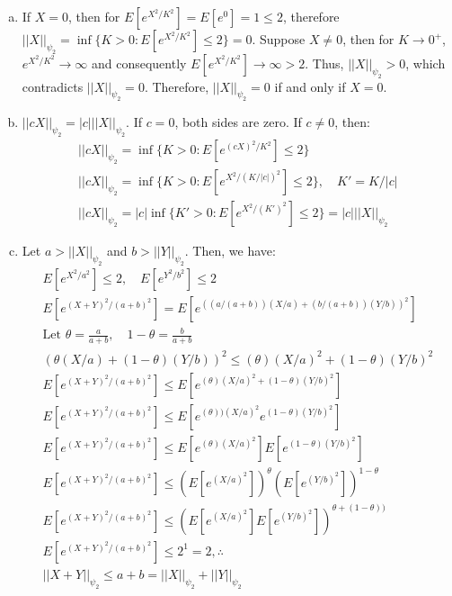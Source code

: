 \documentclass[11pt,a4paper,margin=1in]{article}
\begin{document}
\section{}
\begin{enumerate}[(a)]
    \item If $X = 0$, then for $E[e^{X^2/K^2}] = E[e^{0}] = 1 \leq 2$, therefore
    $||X||_{\psi_2} = \inf\{K > 0 : E[e^{X^2/K^2}] \leq 2\} = 0$. Suppose $X \neq 0$,
    then for $K \rightarrow 0^+$, $e^{X^2/K^2} \rightarrow \infty$ and consequently
    $E[e^{X^2/K^2}] \rightarrow \infty > 2$. Thus, $||X||_{\psi_2} > 0$, which
    contradicts $||X||_{\psi_2} = 0$. Therefore, $||X||_{\psi_2} = 0$ if and only if $X = 0$.
    \item $||cX||_{\psi_2} = |c|||X||_{\psi_2}$. If $c = 0$, both sides are zero.
    If $c \neq 0$, then:
    \begin{gather*}
        ||cX||_{\psi_2} = \inf\{K > 0 : E[e^{(cX)^2/K^2}] \leq 2\} \\
        ||cX||_{\psi_2} = \inf\{K > 0 : E[e^{X^2/(K/|c|)^2}] \leq 2\}, \quad K' = K/|c| \\
        ||cX||_{\psi_2} = |c| \inf\{K' > 0 : E[e^{X^2/(K')^2}] \leq 2\} = |c|||X||_{\psi_2}
    \end{gather*}
    \item Let $a > ||X||_{\psi_2}$ and $b > ||Y||_{\psi_2}$. Then, we have:
    \begin{gather*}
        E[e^{X^2/a^2}] \leq 2, \quad E[e^{Y^2/b^2}] \leq 2 \\
        E[e^{(X+Y)^2/(a+b)^2}] = E[e^{((a/(a+b))(X/a) + (b/(a+b))(Y/b))^2}] \\
        \text{Let } \theta = \frac{a}{a+b}, \quad 1 - \theta = \frac{b}{a+b} \\
        \left(\theta(X/a) + (1 - \theta)(Y/b)\right)^2 \leq (\theta)(X/a)^2 + (1 - \theta)(Y/b)^2 \\
        E[e^{(X+Y)^2/(a+b)^2}] \leq E[e^{(\theta)(X/a)^2 + (1 - \theta)(Y/b)^2}] \\
        E[e^{(X+Y)^2/(a+b)^2}] \leq E[e^{(\theta))(X/a)^2} e^{(1 - \theta)(Y/b)^2}] \\
        E[e^{(X+Y)^2/(a+b)^2}] \leq E[e^{(\theta)(X/a)^2}] E[e^{(1 - \theta)(Y/b)^2}] \\
        E[e^{(X+Y)^2/(a+b)^2}] \leq (E[e^{(X/a)^2}])^{\theta} (E[e^{(Y/b)^2}])^{1 - \theta} \\
        E[e^{(X+Y)^2/(a+b)^2}] \leq (E[e^{(X/a)^2}]E[e^{(Y/b)^2}])^{\theta + (1 - \theta))} \\
        E[e^{(X+Y)^2/(a+b)^2}] \leq 2^1 = 2, \therefore\\
        ||X+Y||_{\psi_2} \leq a + b = ||X||_{\psi_2} + ||Y||_{\psi_2}
    \end{gather*}
\end{enumerate}
\end{document}
